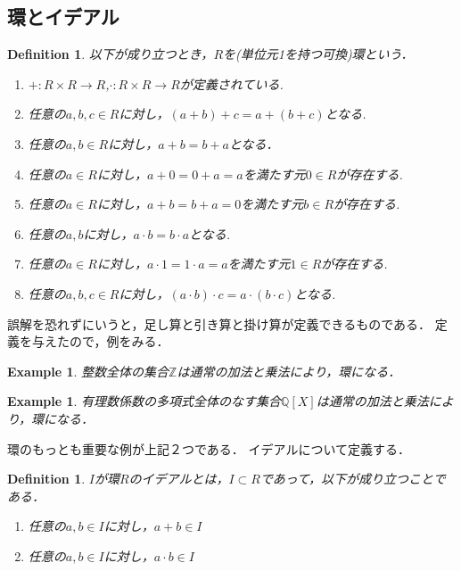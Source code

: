 \documentclass{ujarticle}
\newtheorem{dfn}[thm]{Definition}
\newtheorem{epl}[thm]{Example}
\begin{document}
\subsection{環とイデアル}
\label{subs:環とイデアル}
\begin{dfn}
 以下が成り立つとき，$R$を(単位元1を持つ可換)環という．
 \begin{enumerate}
   \setlength{\parskip}{0cm} %
   \setlength{\itemsep}{0cm} %
   \item $+:R \times R \to R$,$\cdot:R \times R \to R $が定義されている.
   \item 任意の$a,b,c \in R$に対し，$(a + b) +c =a +(b +c)$となる.
   \item 任意の$a,b \in R$に対し，$a + b = b + a$となる．
   \item 任意の$a \in R$に対し，$a + 0 =  0 + a = a$を満たす元$0 \in R$が存在する.
   \item 任意の$a \in R$に対し，$a + b = b + a =0$を満たす元$b \in R $が存在する.
   \item 任意の$a,b$に対し，$a \cdot b = b \cdot a$となる.
   \item 任意の$a \in R$に対し，$a \cdot 1 = 1 \cdot a =a$を満たす元$1 \in R$が存在する.
   \item 任意の$a,b,c \in R$に対し，$(a \cdot b) \cdot c =a \cdot (b \cdot c)$となる.
 \end{enumerate}
\end{dfn}

誤解を恐れずにいうと，足し算と引き算と掛け算が定義できるものである．
定義を与えたので，例をみる．

\begin{epl}
 整数全体の集合$\mathbb{Z}$は通常の加法と乗法により，環になる．
\end{epl}

\begin{epl}
  有理数係数の多項式全体のなす集合$\mathbb{Q}[X]$は通常の加法と乗法により，環になる．
\end{epl}

環のもっとも重要な例が上記２つである．
イデアルについて定義する．
\begin{dfn}
 $I$が環$R$のイデアルとは，$I \subset R$であって，以下が成り立つことである．
 \begin{enumerate}
   \item 任意の$a,b \in I$に対し，$a + b \in I$
   \item 任意の$a,b \in I$に対し，$a \cdot b \in I$
 \end{enumerate}
\end{dfn}
\end{document}

